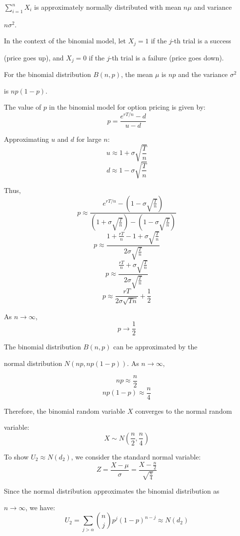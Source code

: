 \documentclass{article}
\begin{document}
\(\sum_{i=1}^n X_i\) is approximately normally distributed with mean \(n\mu\) and variance 

\(n\sigma^2\).

\vspace{\baselineskip}

In the context of the binomial model, let \(X_j = 1\) if the \(j\)-th trial is a success 

(price goes up), and \(X_j = 0\) if the \(j\)-th trial is a failure (price goes down). 

For the binomial distribution \(B(n, p)\), the mean \(\mu\) is \(np\) and the variance \(\sigma^2\) 

is \(np(1-p)\).

\vspace{\baselineskip}

The value of \(p\) in the binomial model for option pricing is given by:
\[
p = \frac{e^{rT/n} - d}{u - d}
\]

Approximating \(u\) and \(d\) for large \(n\):
\[
u \approx 1 + \sigma \sqrt{\frac{T}{n}}
\]
\[
d \approx 1 - \sigma \sqrt{\frac{T}{n}}
\]

Thus,
\[
p \approx \frac{e^{rT/n} - (1 - \sigma \sqrt{\frac{T}{n}})}{(1 + \sigma \sqrt{\frac{T}{n}}) - (1 - \sigma \sqrt{\frac{T}{n}})}
\]
\[
p \approx \frac{1 + \frac{rT}{n} - 1 + \sigma \sqrt{\frac{T}{n}}}{2\sigma \sqrt{\frac{T}{n}}}
\]
\[
p \approx \frac{\frac{rT}{n} + \sigma \sqrt{\frac{T}{n}}}{2\sigma \sqrt{\frac{T}{n}}}
\]
\[
p \approx \frac{rT}{2\sigma \sqrt{Tn}} + \frac{1}{2}
\]

As \(n \to \infty\),
\[
p \to \frac{1}{2}
\]

The binomial distribution \(B(n, p)\) can be approximated by the 

normal distribution \(N(np, np(1-p))\). As \(n \to \infty\),

\[
np \approx \frac{n}{2}
\]
\[
np(1-p) \approx \frac{n}{4}
\]

Therefore, the binomial random variable \(X\) converges to the normal random 

variable:
\[
X \sim N\left(\frac{n}{2}, \frac{n}{4}\right)
\]

To show \( U_2 \approx N(d_2) \), we consider the standard normal variable:
\[
Z = \frac{X - \mu}{\sigma} = \frac{X - \frac{n}{2}}{\sqrt{\frac{n}{4}}}
\]

Since the normal distribution approximates the binomial distribution as 

\(n \to \infty\), we have:
\[
U_2 = \sum_{j>\alpha} \binom{n}{j} p^j (1-p)^{n-j} \approx N(d_2)
\]
\end{document}
